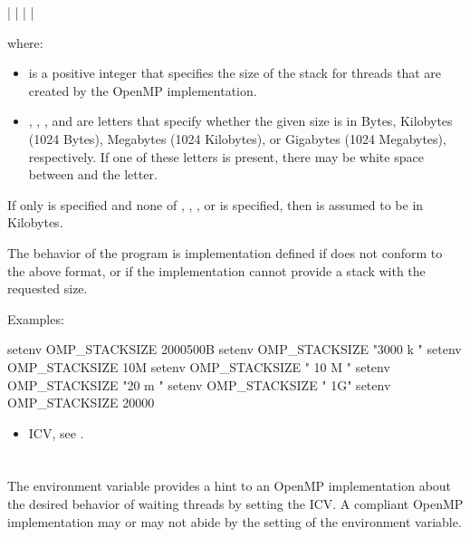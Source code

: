  |  |  |  | 

where:

\begin{itemize}
\item {} is a positive integer that specifies the size of the stack for threads that are created
by the OpenMP implementation.

\item {}, , , and  are letters that specify
whether the given size is in Bytes, Kilobytes
(1024 Bytes), Megabytes (1024 Kilobytes), or Gigabytes (1024 Megabytes),
respectively. If one of these letters is present, there may be white space between
 and the letter.
\end{itemize}

If only  is specified and none of , , , or 
is specified, then  is assumed to be in Kilobytes.

The behavior of the program is implementation defined if  does not
conform to the above format, or if the implementation cannot provide a stack with the
requested size.

Examples:
\begin{ompEnv}
setenv OMP_STACKSIZE 2000500B
setenv OMP_STACKSIZE "3000 k "
setenv OMP_STACKSIZE 10M
setenv OMP_STACKSIZE " 10 M "
setenv OMP_STACKSIZE "20 m "
setenv OMP_STACKSIZE " 1G"
setenv OMP_STACKSIZE 20000
\end{ompEnv}

\crossreferences
\begin{itemize}
\item {} ICV, see .
\end{itemize}









\section{}
\label{sec:OMP_WAIT_POLICY}
The  environment variable provides a hint to an OpenMP
implementation about the desired behavior of waiting threads by setting the
 ICV. A compliant OpenMP implementation may or may not abide by the setting of
the environment variable.

